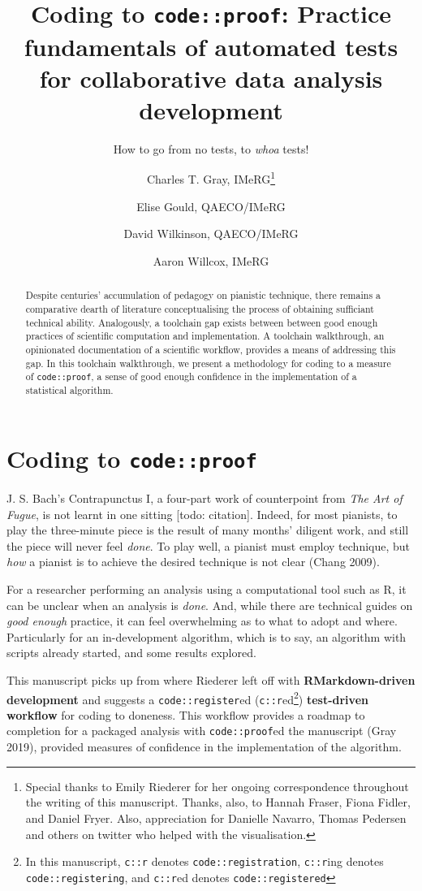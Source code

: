 \documentclass[
]{article}
\title{Coding to \texttt{code::proof}: Practice fundamentals of
automated tests for collaborative data analysis development}
\subtitle{How to go from no tests, to \emph{whoa} tests!}
\author{Charles T. Gray, IMeRG\footnote{Special thanks to Emily Riederer
  for her ongoing correspondence throughout the writing of this
  manuscript. Thanks, also, to Hannah Fraser, Fiona Fidler, and Daniel
  Fryer. Also, appreciation for Danielle Navarro, Thomas Pedersen and
  others on twitter who helped with the visualisation.} \and Elise
Gould, QAECO/IMeRG \and David Wilkinson, QAECO/IMeRG \and Aaron Willcox,
IMeRG}
\date{}
\begin{document}
\maketitle
\begin{abstract}
Despite centuries' accumulation of pedagogy on pianistic technique,
there remains a comparative dearth of literature conceptualising the
process of obtaining sufficiant technical ability. Analogously, a
toolchain gap exists between between good enough practices of scientific
computation and implementation. A toolchain walkthrough, an opinionated
documentation of a scientific workflow, provides a means of addressing
this gap. In this toolchain walkthrough, we present a methodology for
coding to a measure of \texttt{code::proof}, a sense of good enough
confidence in the implementation of a statistical algorithm.
\end{abstract}

\newcommand{\codereg}[1]{
\fbox{\begin{minipage}{15em}
#1
\end{minipage}}
}

\hypertarget{coding-to-codeproof}{%
\section{\texorpdfstring{Coding to
\texttt{code::proof}}{Coding to code::proof}}\label{coding-to-codeproof}}

J. S. Bach's Contrapunctus I, a four-part work of counterpoint from
\emph{The Art of Fugue}, is not learnt in one sitting {[}todo:
citation{]}. Indeed, for most pianists, to play the three-minute piece
is the result of many months' diligent work, and still the piece will
never feel \emph{done}. To play well, a pianist must employ technique,
but \emph{how} a pianist is to achieve the desired technique is not
clear (Chang 2009).

For a researcher performing an analysis using a computational tool such
as R, it can be unclear when an analysis is \emph{done}. And, while
there are technical guides on \emph{good enough} practice, it can feel
overwhelming as to what to adopt and where. Particularly for an
in-development algorithm, which is to say, an algorithm with scripts
already started, and some results explored.

This manuscript picks up from where Riederer left off with
\textbf{RMarkdown-driven development} and suggests a
\texttt{code::register}ed (\texttt{c::r}ed\footnote{In this manuscript,
  \texttt{c::r} denotes \texttt{code::registration}, \texttt{c::r}ing
  denotes \texttt{code::registering}, and \texttt{c::r}ed denotes
  \texttt{code::registered}}) \textbf{test-driven workflow} for coding
to doneness. This workflow provides a roadmap to completion for a
packaged analysis with \texttt{code::proof}ed the manuscript (Gray
2019), provided measures of confidence in the implementation of the
algorithm.
\end{document}
